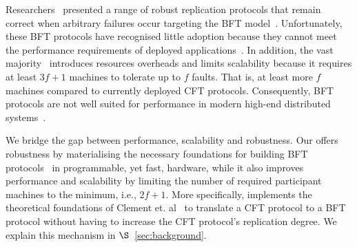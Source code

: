  Researchers~\cite{Castro:2002, DBLP:journals/corr/abs-1803-05069, 10.1145/1658357.1658358} presented a range of robust replication protocols that remain correct when arbitrary failures occur targeting the BFT model~\cite{Lamport:1982}. Unfortunately, these BFT protocols have recognised little adoption because they cannot meet the performance requirements of deployed applications~\cite{bft-time-is-now}. In addition, the vast majority~\cite{Castro:2002, DBLP:journals/corr/abs-1803-05069} introduces resources overheads and limits scalability because it requires at least $3f+1$ machines to tolerate up to $f$ faults. That is, at least more $f$ machines compared to currently deployed CFT protocols. Consequently, BFT protocols are not well suited for performance in modern high-end distributed systems~\cite{bftForSkeptics}.

 We bridge the gap between performance, scalability and robustness. Our \projecttitle{} offers robustness by materialising the necessary foundations for building BFT protocols~\cite{clement2012} in programmable, yet fast, hardware, while it also improves performance and scalability by limiting the number of required participant machines to the minimum, i.e., $2f+1$. More specifically, \projecttitle{} implements the theoretical foundations of Clement et. al~\cite{clement2012} to translate a CFT protocol to a BFT protocol without having to increase the CFT protocol's replication degree. We explain this mechanism in $\S$~\ref{sec:background}.  %



